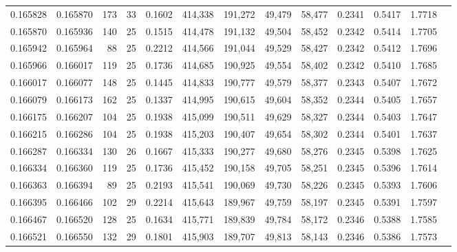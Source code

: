 \begin{tabular}{rrrrrrrrrrrrr}
0.165828 & 0.165870 & 173 &  33 &                                     0.1602 & 414,338 & 191,272 &  49,479 &  58,477 & 0.2341 & 0.5417 & 1.7718 \\
0.165870 & 0.165936 & 140 &  25 &                                     0.1515 & 414,478 & 191,132 &  49,504 &  58,452 & 0.2342 & 0.5414 & 1.7705 \\
0.165942 & 0.165964 &  88 &  25 &                                     0.2212 & 414,566 & 191,044 &  49,529 &  58,427 & 0.2342 & 0.5412 & 1.7696 \\
0.165966 & 0.166017 & 119 &  25 &                                     0.1736 & 414,685 & 190,925 &  49,554 &  58,402 & 0.2342 & 0.5410 & 1.7685 \\
0.166017 & 0.166077 & 148 &  25 &                                     0.1445 & 414,833 & 190,777 &  49,579 &  58,377 & 0.2343 & 0.5407 & 1.7672 \\
0.166079 & 0.166173 & 162 &  25 &                                     0.1337 & 414,995 & 190,615 &  49,604 &  58,352 & 0.2344 & 0.5405 & 1.7657 \\
0.166175 & 0.166207 & 104 &  25 &                                     0.1938 & 415,099 & 190,511 &  49,629 &  58,327 & 0.2344 & 0.5403 & 1.7647 \\
0.166215 & 0.166286 & 104 &  25 &                                     0.1938 & 415,203 & 190,407 &  49,654 &  58,302 & 0.2344 & 0.5401 & 1.7637 \\
0.166287 & 0.166334 & 130 &  26 &                                     0.1667 & 415,333 & 190,277 &  49,680 &  58,276 & 0.2345 & 0.5398 & 1.7625 \\
0.166334 & 0.166360 & 119 &  25 &                                     0.1736 & 415,452 & 190,158 &  49,705 &  58,251 & 0.2345 & 0.5396 & 1.7614 \\
0.166363 & 0.166394 &  89 &  25 &                                     0.2193 & 415,541 & 190,069 &  49,730 &  58,226 & 0.2345 & 0.5393 & 1.7606 \\
0.166395 & 0.166466 & 102 &  29 &                                     0.2214 & 415,643 & 189,967 &  49,759 &  58,197 & 0.2345 & 0.5391 & 1.7597 \\
0.166467 & 0.166520 & 128 &  25 &                                     0.1634 & 415,771 & 189,839 &  49,784 &  58,172 & 0.2346 & 0.5388 & 1.7585 \\
0.166521 & 0.166550 & 132 &  29 &                                     0.1801 & 415,903 & 189,707 &  49,813 &  58,143 & 0.2346 & 0.5386 & 1.7573 \\

\end{tabular}
